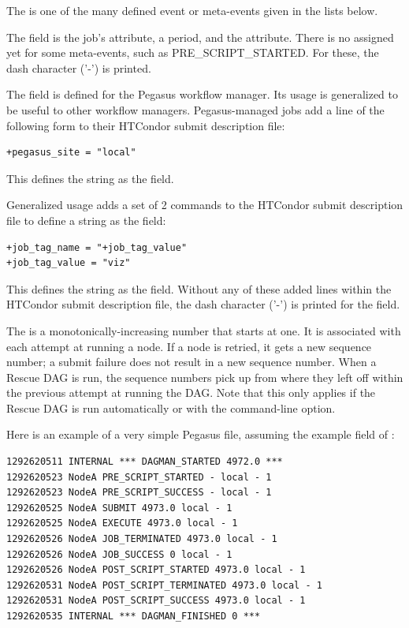 \begin{description}
The  is one of the many defined event or meta-events given
in the lists below.

The  field is the job's 
 attribute, a period, and the  attribute. 
There is no  assigned yet for some meta-events,
such as PRE\_SCRIPT\_STARTED.
For these, the dash character ('-') is printed. 

The  field is defined for the Pegasus workflow manager.
Its usage is generalized to be useful to other workflow managers.
Pegasus-managed jobs add a line of the following form to their
HTCondor submit description file:
\begin{verbatim}
+pegasus_site = "local"
\end{verbatim}
This defines the string  as the  field.
 
Generalized usage adds a set of 2 commands to the HTCondor
submit description file to define a string as the  field:
\begin{verbatim}
+job_tag_name = "+job_tag_value"
+job_tag_value = "viz"
\end{verbatim}
This defines the string  as the  field.
Without any of these added lines within the HTCondor submit description file,
the dash character ('-') is printed for the  field. 

The  is a monotonically-increasing number 
that starts at one.
It is associated with each attempt at running a node.
If a node is retried, it gets a new sequence number;
a submit failure does not result in a new sequence number.
When a Rescue DAG is run,
the sequence numbers pick up from where they left off within the previous
attempt at running the DAG.
Note that this only applies if the Rescue
DAG is run automatically or with the  command-line option.

\end{description}

Here is an example of a very simple Pegasus  file,
assuming the example  field of :

\begin{verbatim}
1292620511 INTERNAL *** DAGMAN_STARTED 4972.0 ***
1292620523 NodeA PRE_SCRIPT_STARTED - local - 1
1292620523 NodeA PRE_SCRIPT_SUCCESS - local - 1
1292620525 NodeA SUBMIT 4973.0 local - 1
1292620525 NodeA EXECUTE 4973.0 local - 1
1292620526 NodeA JOB_TERMINATED 4973.0 local - 1
1292620526 NodeA JOB_SUCCESS 0 local - 1
1292620526 NodeA POST_SCRIPT_STARTED 4973.0 local - 1
1292620531 NodeA POST_SCRIPT_TERMINATED 4973.0 local - 1
1292620531 NodeA POST_SCRIPT_SUCCESS 4973.0 local - 1
1292620535 INTERNAL *** DAGMAN_FINISHED 0 ***
\end{verbatim}



